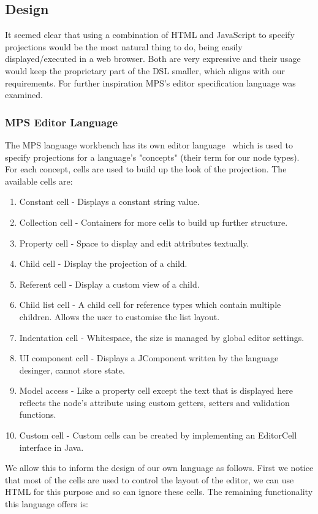 \documentclass{article}
\begin{document}
{\subsection{Design}

It seemed clear that using a combination of HTML and JavaScript to specify projections would be the most natural thing to do, being easily displayed/executed in a web browser. Both are very expressive and their usage would keep the proprietary part of the DSL smaller, which aligns with our requirements. For further inspiration MPS's editor specification language was examined.

\subsubsection{MPS Editor Language}
The MPS language workbench has its own editor language~\cite{mpsEditorLanguage} which is used to specify projections for a language's "concepts" (their term for our node types). For each concept, cells are used to build up the look of the projection. The available cells are:
\begin{enumerate}
\item Constant cell - Displays a constant string value.
\item Collection cell - Containers for more cells to build up further structure.
\item Property cell - Space to display and edit attributes textually.
\item Child cell - Display the projection of a child.
\item Referent cell - Display a custom view of a child.
\item Child list cell - A child cell for reference types which contain multiple children. Allows the user to customise the list layout.
\item Indentation cell - Whitespace, the size is managed by global editor settings.
\item UI component cell - Displays a JComponent written by the language desinger, cannot store state.
\item Model access - Like a property cell except the text that is displayed here reflects the node's attribute using custom getters, setters and validation functions.
\item Custom cell - Custom cells can be created by implementing an EditorCell interface in Java.
\end{enumerate}
%
We allow this to inform the design of our own language as follows. First we notice that most of the cells are used to control the layout of the editor, we can use HTML for this purpose and so can ignore these cells. The remaining functionality this language offers is:
}
\end{document}

